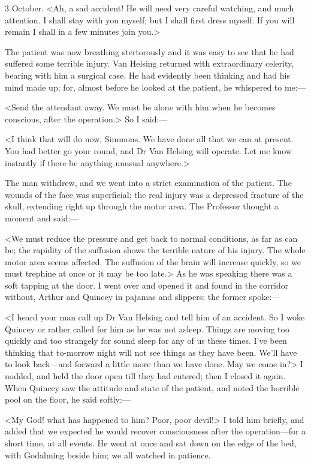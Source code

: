 \begin{diary}{3 October.}
<Ah, a sad accident! He will need very careful watching, and much attention. I shall stay with you myself; but I shall first dress myself. If you will remain I shall in a few minutes join you.>

The patient was now breathing stertorously and it was easy to see that he had suffered some terrible injury. Van Helsing returned with extraordinary celerity, bearing with him a surgical case. He had evidently been thinking and had his mind made up; for, almost before he looked at the patient, he whispered to me:—

<Send the attendant away. We must be alone with him when he becomes conscious, after the operation.> So I said:—

<I think that will do now, Simmons. We have done all that we can at present. You had better go your round, and Dr Van Helsing will operate. Let me know instantly if there be anything unusual anywhere.>

The man withdrew, and we went into a strict examination of the patient. The wounds of the face was superficial; the real injury was a depressed fracture of the skull, extending right up through the motor area. The Professor thought a moment and said:—

<We must reduce the pressure and get back to normal conditions, as far as can be; the rapidity of the suffusion shows the terrible nature of his injury. The whole motor area seems affected. The suffusion of the brain will increase quickly, so we must trephine at once or it may be too late.> As he was speaking there was a soft tapping at the door. I went over and opened it and found in the corridor without, Arthur and Quincey in pajamas and slippers: the former spoke:—

<I heard your man call up Dr Van Helsing and tell him of an accident. So I woke Quincey or rather called for him as he was not asleep. Things are moving too quickly and too strangely for sound sleep for any of us these times. I've been thinking that to-morrow night will not see things as they have been. We'll have to look back—and forward a little more than we have done. May we come in?> I nodded, and held the door open till they had entered; then I closed it again. When Quincey saw the attitude and state of the patient, and noted the horrible pool on the floor, he said softly:—

<My God! what has happened to him? Poor, poor devil!> I told him briefly, and added that we expected he would recover consciousness after the operation—for a short time, at all events. He went at once and sat down on the edge of the bed, with Godalming beside him; we all watched in patience.


\end{diary}
